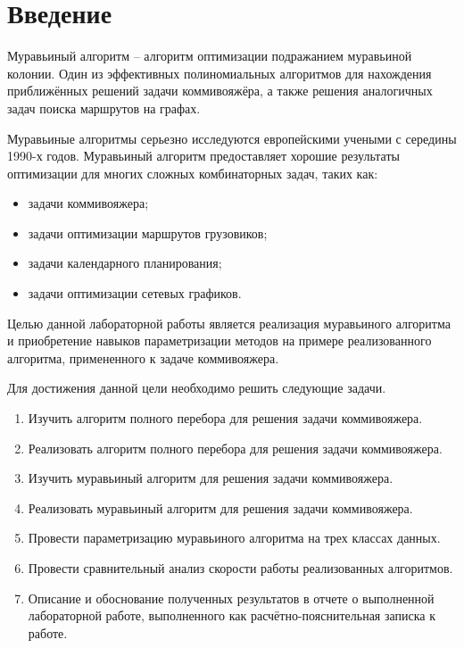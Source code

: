 \chapter*{Введение}
Муравьиный алгоритм – алгоритм оптимизации подражанием муравьиной колонии. Один из эффективных полиномиальных алгоритмов для нахождения приближённых решений задачи коммивояжёра, а также решения аналогичных задач поиска маршрутов на графах.

Муравьиные алгоритмы серьезно исследуются европейскими учеными с середины 1990-х годов. Муравьиный алгоритм предоставляет хорошие результаты оптимизации для многих сложных комбинаторных задач, таких как:
\begin{itemize}
	\item задачи коммивояжера;
	\item задачи оптимизации маршрутов грузовиков;
	\item задачи календарного планирования;
	\item задачи оптимизации сетевых графиков.
\end{itemize}

Целью данной лабораторной работы является реализация муравьиного алгоритма и приобретение навыков параметризации методов на примере реализованного алгоритма, примененного к задаче коммивояжера.

Для достижения данной цели необходимо решить следующие задачи.

\begin{enumerate}
	\item Изучить алгоритм полного перебора для решения задачи коммивояжера.
	\item Реализовать алгоритм полного перебора для решения задачи коммивояжера.
	\item Изучить муравьиный алгоритм для решения задачи коммивояжера.
	\item Реализовать муравьиный алгоритм для решения задачи коммивояжера.
	\item Провести параметризацию муравьиного алгоритма на трех классах
	данных.
	\item Провести сравнительный анализ скорости работы реализованных
	алгоритмов.
	\item Описание и обоснование полученных результатов в отчете о выполненной лабораторной работе, выполненного как расчётно-пояснительная записка к работе.
\end{enumerate}
